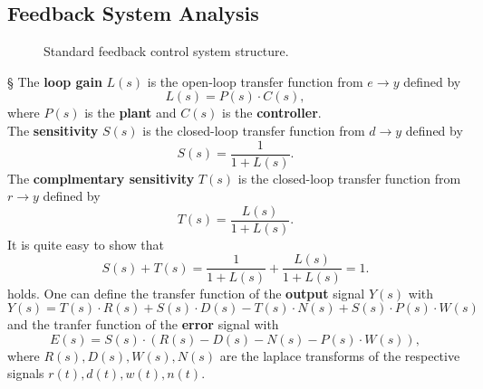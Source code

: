 \documentclass[a4paper,12 pt]{article}
\numberwithin{equation}{section}
\theoremstyle{definition}
\theoremstyle{remark}
\theoremstyle{definition}
\theoremstyle{definition}
\theoremstyle{definition}
\theoremstyle{remark}
\begin{document}
\subsection{Feedback System Analysis}
\begin{figure}[htbp]

\begin{center}
\caption{Standard feedback control system structure.}
\end{center}
\end{figure}



§
The \textbf{loop gain} $L(s)$ is the open-loop transfer function from $e\rightarrow y$ defined by \begin{equation}L(s)=P(s)\cdot C(s),\end{equation}
where $P(s)$ is the \textbf{plant} and $C(s)$ is the \textbf{controller}. \\
The \textbf{sensitivity} $S(s)$ is the closed-loop transfer function from $d\rightarrow y$ defined by
\begin{equation} 
S(s)=\frac{1}{1+L(s)}.
\end{equation}
The \textbf{complmentary sensitivity} $T(s)$ is the closed-loop transfer function from $r\rightarrow y$ defined by 
\begin{equation}
T(s)=\frac{L(s)}{1+L(s)}.
\end{equation}
It is quite easy to show that \begin{equation}
S(s)+T(s)=\frac{1}{1+L(s)}+\frac{L(s)}{1+L(s)}=1. 
 \end{equation}
holds.
One can define the transfer function of the \textbf{output} signal $Y(s)$ with
\begin{equation}
Y(s)=T(s)\cdot R(s) + S(s)\cdot D(s) -T(s)\cdot N(s) + S(s) \cdot P(s) \cdot W(s)
\end{equation}
and the tranfer function of the \textbf{error} signal with 
\begin{equation}
E(s)=S(s)\cdot \left( R(s)-D(s)-N(s)-P(s)\cdot W(s) \right),
\end{equation}
where $R(s),D(s),W(s),N(s)$ are the laplace transforms of the respective signals $r(t),d(t),w(t),n(t)$. 
\end{document}
